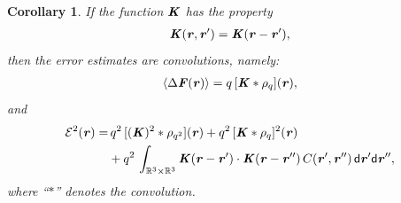 \documentclass[journal=jacsat,manuscript=article]{achemso}
\renewcommand{\v}[1]{\textbf{\textit{#1}}}
\renewcommand{\d}[1]{\textsf{#1}}
\newtheorem{corollary}[theorem]{Corollary}
\begin{document}
\begin{corollary}\label{thm:tmp2}
  If the function $\v K$ has the property
  \begin{align}
    \label{eqn:cor-kernel}
    \v K(\v r,\v r') = \v K(\v r - \v r'),    
  \end{align}
  then the error estimates are convolutions, namely:
  \begin{align}\label{eqn:cor-meanf}
    \langle\Delta\v F(\v r)\rangle
    =q\, [\v K\ast\rho_q](\v r),
  \end{align}
  and 
  \begin{align}\nonumber
    \mathcal E^2 (\v r) 
    = &\,
    q^2\,[(\v K)^2\ast\rho_{q^2}] (\v r) + 
    q^2\,[\v K\ast\rho_{q}]^2 (\v r) \\\label{eqn:cor-error}
    &+
    q^2\,\int_{\mathbb R^3\times\mathbb R^3}
    \v K(\v r-\v r')\cdot
    \v K(\v r-\v r'')\,
    C(\v r', \v r'')\,
    \d d\v r'\d d\v r'',
  \end{align}
  where ``$\ast$'' denotes the convolution.
\end{corollary}
\end{document}
